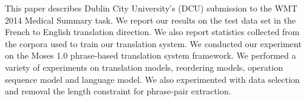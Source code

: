 This paper describes Dublin City University's (DCU) submission to the WMT 2014 Medical Summary task. We report our results on the test data set in the French to English translation direction. We also report statistics collected from the corpora used to train our translation system. We conducted our experiment on the Moses 1.0 phrase-based translation system framework. We performed a variety of experiments on translation models, reordering models, operation sequence model and language model. We also experimented with data selection and removal the length constraint for phrase-pair extraction.

